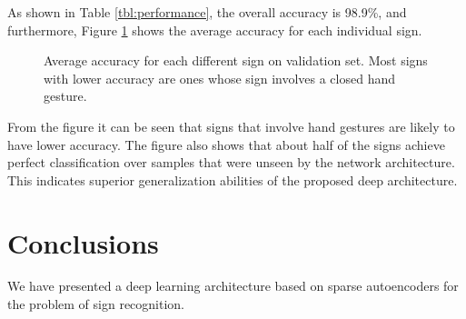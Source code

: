 \documentclass[a4paper]{article}
\begin{document}
As shown in Table \ref{tbl:performance}, the overall accuracy is 98.9\%, and
furthermore, Figure \ref{fig:errPerClass} shows the average accuracy for each
individual sign. 
\begin{figure}
\centering
{}
\caption{Average accuracy for each different sign on validation set. Most signs 
with lower accuracy are ones whose sign involves a closed hand gesture.}
\label{fig:errPerClass}
\end{figure}
From the figure it can be seen that signs that involve hand gestures are likely
to have lower accuracy. The figure also shows that about half of the signs
achieve perfect classification over samples that were unseen by the network
architecture. This indicates superior generalization abilities of the proposed
deep architecture. 


\section{Conclusions}

We have presented a deep learning architecture based on sparse autoencoders
for the problem of sign recognition. 

 

\end{document}
